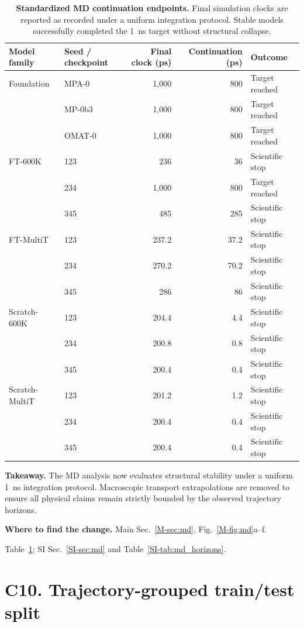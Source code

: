 \documentclass[11pt]{article}
\newcommand{\location}[2]{\par{\small\textbf{Where to find the change.} #1\par #2}\par}
\begin{document}
\begin{table}[!htbp]
\centering\small
\caption{\textbf{Standardized MD continuation endpoints.} Final simulation clocks are reported as recorded under a uniform integration protocol. Stable models successfully completed the 1~ns target without structural collapse.}
\label{tab:resp-c9-md-endpoints}
\begin{tabular}{llrrl}
\toprule
Model family & Seed / checkpoint & Final clock (ps) & Continuation (ps) & Outcome \\
\midrule
Foundation & MPA-0 & 1,000 & 800 & Target reached \\
 & MP-0b3 & 1,000 & 800 & Target reached \\
 & OMAT-0 & 1,000 & 800 & Target reached \\
FT-600K & 123 & 236 & 36 & Scientific stop \\
 & 234 & 1,000 & 800 & Target reached \\
 & 345 & 485 & 285 & Scientific stop \\
FT-MultiT & 123 & 237.2 & 37.2 & Scientific stop \\
 & 234 & 270.2 & 70.2 & Scientific stop \\
 & 345 & 286 & 86 & Scientific stop \\
Scratch-600K & 123 & 204.4 & 4.4 & Scientific stop \\
 & 234 & 200.8 & 0.8 & Scientific stop \\
 & 345 & 200.4 & 0.4 & Scientific stop \\
Scratch-MultiT & 123 & 201.2 & 1.2 & Scientific stop \\
 & 234 & 200.4 & 0.4 & Scientific stop \\
 & 345 & 200.4 & 0.4 & Scientific stop \\
\bottomrule
\end{tabular}
\end{table}

\textbf{Takeaway.} The MD analysis now evaluates structural stability under a uniform 1~ns integration protocol. Macroscopic transport extrapolations are removed to ensure all physical claims remain strictly bounded by the observed trajectory horizons.
\location{Main Sec.~\ref{M-sec:md}, Fig.~\ref{M-fig:md}a--f.}{Table~\ref{tab:resp-c9-md-endpoints}; SI Sec.~\ref{SI-sec:md} and Table~\ref{SI-tab:md_horizons}.}
\section*{C10. Trajectory-grouped train/test split}
\end{document}
